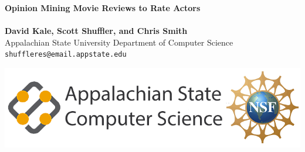 \documentclass[a0,portrait]{a0poster}
\begin{document}


\begin{minipage}[b]{0.75\linewidth}
\veryHuge \color{NavyBlue} \textbf{Opinion Mining Movie Reviews to Rate Actors} \color{Black}\\ %
\Huge\textit{}\\[2cm] %
\huge \textbf{David Kale, Scott Shuffler, and Chris Smith}\\[0.5cm] %
\huge Appalachian State University Department of Computer Science\\[0.6cm] %
\Large \texttt{shuffleres@email.appstate.edu}\\
\end{minipage}
%
\begin{minipage}[b]{0.25\linewidth}
\includegraphics[width=20cm]{cs6}\\
\end{minipage}

\vspace{1cm} %

\end{document}

